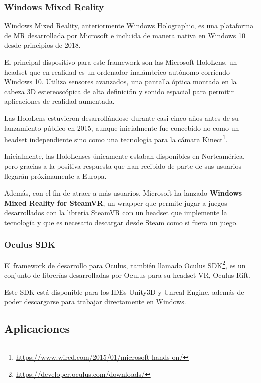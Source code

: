 \subsubsection{Windows Mixed Reality}

Windows Mixed Reality, anteriormente Windows Holographic, es una plataforma de \acs{MR} desarrollada por Microsoft e incluida de manera nativa en Windows 10 desde principios de 2018.

El principal dispositivo para este framework son las Microsoft HoloLens, un headset que en realidad es un ordenador inalámbrico autónomo corriendo Windows 10. Utiliza sensores avanzados, una pantalla óptica montada en la cabeza 3D estereoscópica de alta definición y sonido espacial para permitir aplicaciones de realidad aumentada.

Las HoloLens estuvieron desarrollándose durante casi cinco años antes de su lanzamiento público en 2015, aunque inicialmente fue concebido no como un headset independiente sino como una tecnología para la cámara Kinect\footnote{\url{https://www.wired.com/2015/01/microsoft-hands-on/}}.

Inicialmente, las HoloLenses únicamente estaban disponibles en Norteamérica, pero gracias a la positiva respuesta que han recibido de parte de sus usuarios llegarán próximamente a Europa.

Además, con el fin de atraer a más usuarios, Microsoft ha lanzado \textbf{Windows Mixed Reality for SteamVR}, un wrapper que permite jugar a juegos desarrollados con la librería SteamVR con un headset que implemente la tecnología y que es necesario descargar desde Steam como si fuera un juego.

\subsubsection{Oculus SDK}

El framework de desarrollo para Oculus, también llamado Oculus SDK\footnote{\url{https://developer.oculus.com/downloads/}}, es un conjunto de librerías desarrolladas por Oculus para su headset \acs{VR}, Oculus Rift.

Este \acs{SDK} está disponible para los IDEs Unity3D y Unreal Engine, además de poder descargarse para trabajar directamente en Windows.
    

\subsection{Aplicaciones}

